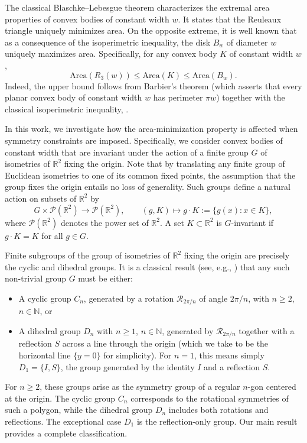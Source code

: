 \documentclass[11pt,letterpaper,reqno]{amsart}
\newcommand{\R}{\mathbb{R}}
\providecommand{\R}{\mathbb{R}}
\providecommand{\Area}{\mathrm{Area}}
\begin{document}
The classical Blaschke--Lebesgue theorem \cite{Blaschke1915,Firey1960, Hynd2024,Lebesgue1914} characterizes the extremal area properties of convex bodies of constant width $w$. It states that the Reuleaux triangle uniquely minimizes area. On the opposite extreme, it is well known that as a consequence of the isoperimetric inequality, the disk $B_w$ of diameter $w$ uniquely maximizes area. Specifically, for any convex body $K$ of constant width $w$,
\[
\Area(R_3(w)) \leq \Area(K) \leq \Area(B_w).
\]
Indeed, the upper bound follows from Barbier's theorem \cite{Ba} (which asserts that every planar convex body of constant width $w$ has perimeter $\pi w$) together with the classical isoperimetric inequality, \cite[Section 7.2]{Schneider2014}.

In this work, we investigate how the area-minimization property is affected when symmetry constraints are imposed. Specifically, we consider convex bodies of constant width that are invariant under the action of a finite group $G$ of isometries of $\R^2$ fixing the origin. Note that by translating any finite group of Euclidean isometries to one of its common fixed points, the assumption that the group fixes the origin entails no loss of generality. Such groups define a natural action on subsets of $\R^2$ by
\[
G \times \mathcal{P}(\R^2) \to \mathcal{P}(\R^2), \qquad (g, K) \mapsto g \cdot K := \{g(x) : x \in K\},
\]
where $\mathcal{P}(\R^2)$ denotes the power set of $\R^2$. A set $K \subset \R^2$ is $G$-invariant if $g \cdot K = K$ for all $g \in G$.

Finite subgroups of the group of isometries of \(\R^2\) fixing the origin are precisely the cyclic and dihedral groups. It is a classical result (see, e.g., \cite[Theorem 19.1]{Armstrong1988}) that any such non-trivial group \(G\) must be either:
\begin{itemize}
    \item A cyclic group \(C_n\), generated by a rotation \(\mathcal R_{2\pi/n}\) of angle \(2\pi/n\), with \(n\ge 2\), $n \in \mathbb{N}$, or
    \item A dihedral group \(D_n\) with \(n\ge 1\), $n \in \mathbb{N}$, generated by \(\mathcal R_{2\pi/n}\) together with a reflection \(S\) across a line through the origin (which we take to be the horizontal line \(\{y = 0\}\) for simplicity). For \(n=1\), this means simply \(D_1=\{I,S\}\), the group generated by the identity $I$ and a reflection $S$.
\end{itemize}
For \(n\ge 2\), these groups arise as the symmetry group of a regular \(n\)-gon centered at the origin. The cyclic group \(C_n\) corresponds to the rotational symmetries of such a polygon, while the dihedral group \(D_n\) includes both rotations and reflections. The exceptional case \(D_1\) is the reflection-only group.
Our main result provides a complete classification.
\end{document}
